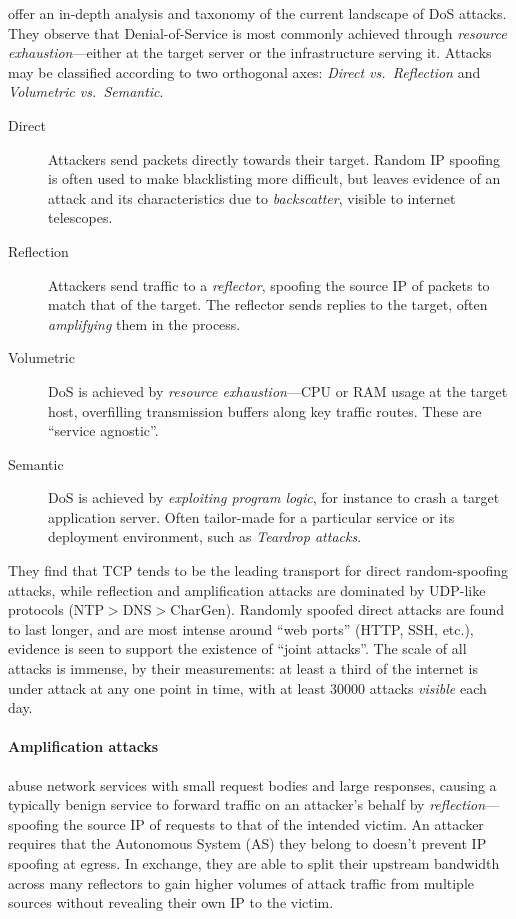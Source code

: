 \Textcite{DBLP:conf/imc/JonkerKKRSD17} offer an in-depth analysis and taxonomy of the current landscape of DoS attacks.
They observe that Denial-of-Service is most commonly achieved through \emph{resource exhaustion}---either at the target server or the infrastructure serving it.
Attacks may be classified according to two orthogonal axes: \emph{Direct vs.\ Reflection} and \emph{Volumetric vs.\ Semantic}.
\begin{description}
	\item[Direct] Attackers send packets directly towards their target. Random IP spoofing is often used to make blacklisting more difficult, but leaves evidence of an attack and its characteristics due to \emph{backscatter}, visible to internet telescopes.
	\item[Reflection] Attackers send traffic to a \emph{reflector}, spoofing the source IP of packets to match that of the target. The reflector sends replies to the target, often \emph{amplifying} them in the process.
	\item[Volumetric] DoS is achieved by \emph{resource exhaustion}---CPU or RAM usage at the target host, overfilling transmission buffers along key traffic routes. These are ``service agnostic''.
	\item[Semantic] DoS is achieved by \emph{exploiting program logic}, for instance to crash a target application server. Often tailor-made for a particular service or its deployment environment, such as \emph{Teardrop attacks}.
\end{description}
They find that TCP tends to be the leading transport for direct random-spoofing attacks, while reflection and amplification attacks are dominated by UDP-like protocols (NTP$>$DNS$>$CharGen).
Randomly spoofed direct attacks are found to last longer, and are most intense around ``web ports'' (HTTP, SSH, etc.), evidence is seen to support the existence of ``joint attacks''.
The scale of all attacks is immense, by their measurements: at least a third of the internet is under attack at any one point in time, with at least \num{30000} attacks \emph{visible} each day.

\paragraph{Amplification attacks}
abuse network services with small request bodies and large responses, causing a typically benign service to forward traffic on an attacker's behalf by \emph{reflection}---spoofing the source IP of requests to that of the intended victim.
An attacker requires that the Autonomous System (AS) they belong to doesn't prevent IP spoofing at egress.
In exchange, they are able to split their upstream bandwidth across many reflectors to gain higher volumes of attack traffic from multiple sources without revealing their own IP to the victim.

